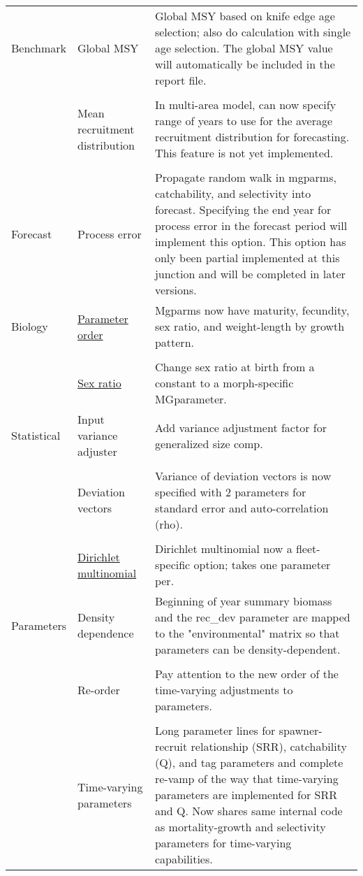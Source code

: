 \documentclass[12pt]{article}
\begin{document}
\begin{center}
\begin{longtable}{p{2cm} p{3cm} p{10cm}}
		\hline
		Benchmark 
		& Global MSY &  
		Global MSY based on knife edge age selection; also do calculation with single age selection. The global MSY value will automatically be included in the report file.\\
		\\					
		& Mean recruitment distribution & 
		In multi-area model, can now specify range of years to use for the average recruitment distribution for forecasting. This feature is not yet implemented. \\
		\\
		\hline
		Forecast & 
		Process error & 
		Propagate random walk in mgparms, catchability, and selectivity into forecast. Specifying the end year for process error in the forecast period will implement this option.  This option has only been partial implemented at this junction and will be completed in later versions.\\
		\hline
		Biology 
		& \hyperlink{MGorder}{Parameter order} & 
		Mgparms now have maturity, fecundity, sex ratio, and weight-length by growth pattern.\\
		\\						
		& \hyperlink{SexRatio}{Sex ratio} & 
		Change sex ratio at birth from a constant to a morph-specific MGparameter. \\
		\hline
		Statistical 
		& Input variance adjuster & 
		Add variance adjustment factor for generalized size comp. \\
		\\						
		& Deviation vectors & 
		Variance of deviation vectors is now specified with 2 parameters for standard error and auto-correlation (rho).\\
		\\						
		& \hyperlink{Dirichlet}{Dirichlet multinomial} & 
		Dirichlet multinomial now a fleet-specific option; takes one parameter per. \\
		\hline
		Parameters 
		& Density dependence & 
		Beginning of year summary biomass and the rec\_dev parameter are mapped to the    "environmental" matrix so that parameters can be density-dependent.\\
		\\						
		& Re-order & 
		Pay attention to the new order of the time-varying adjustments to parameters. \\
		\\						
		& Time-varying parameters & 
		Long parameter lines for spawner-recruit relationship (SRR), catchability (Q), and tag parameters and complete re-vamp of the way that time-varying parameters are implemented for SRR and Q.  Now shares same internal code as mortality-growth and selectivity parameters for time-varying capabilities.\\
		\hline	
	\end{longtable}
\end{center}
	
\end{document}
